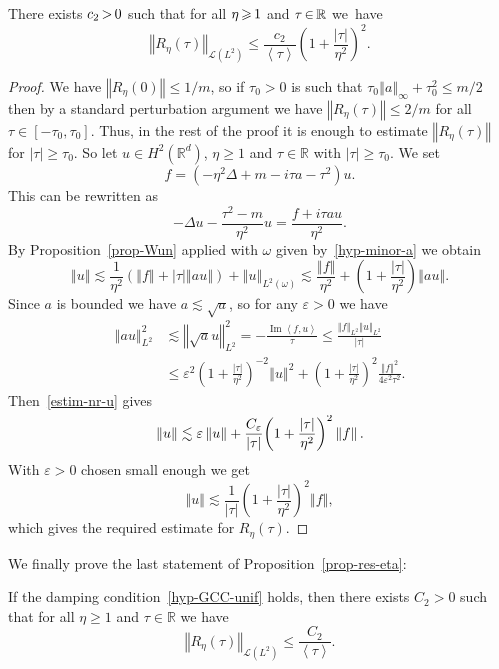 \documentclass[AHL,Unicode,longabstracts]{cedram}
\newcommand{\abs}[1]{\left\vert #1\right\vert}
\newcommand{\nr}[1]{\left\Vert #1\right\Vert}
\newcommand{\innp}[2]{\left< #1, #2 \right>}
\newcommand{\pppg}[1] {\left< #1 \right>}
\renewcommand{\leq}{\leqslant}
\renewcommand{\geq}{\geqslant}
\newcommand{\1}{\mathds 1}
\DeclareMathOperator{\Imop}{Im}
\renewcommand{\Im}{\Imop}
\newcommand{\R}{\mathbb{R}}
\newcommand{\D}{\Delta}
\newcommand{\e}{\varepsilon}
\renewcommand{\t}{\tau}
\renewcommand{\o}{\omega}
\newcommand{\Lc}{{\mathcal L}}
\newcommand*{\Mk}{\mkern -2mu}
\begin{document}
\begin{prop}\label{prop-estim-Reta}
There exists $c_2 \Mk>\Mk 0$ such that for all $\eta \Mk\geq\Mk 1$ and $\t \Mk\in\Mk \R$ we~have
\[
\nr{R_\eta(\t)}_{\Lc(L^2)} \leq \frac {c_2}{\pppg \tau} \left(1 + \frac {\abs \t}{\eta^2} \right)^2.
\]
\end{prop}

\begin{proof}
We have $\nr{R_\eta(0)} \leq 1/m$, so if $\t_0 > 0$ is such that $\t_0 \nr{a}_\infty + \t_0^2 \leq m/2$ then by a standard perturbation argument we have $\nr{R_\eta(\t)} \leq 2/m$ for all $\t \in [-\t_0,\t_0]$. Thus, in the rest of the proof it is enough to estimate $\nr{R_\eta(\t)}$ for $\abs \t \geq \t_0$. So let $u \in H^2(\R^d)$, $\eta \geq 1$ and $\t \in \R$ with $\abs \t \geq \t_0$. We set
\begin{equation*}
f = (-\eta^2 \D + m - i \t a - \t^2) u.
\end{equation*}
This can be rewritten as
\[
-\D u - \frac {\t^2-m} {\eta^2} u = \frac{f + i\t a u}{\eta^2}.
\]
By Proposition~\ref{prop-Wun} applied with $\o$ given by~\eqref{hyp-minor-a} we obtain
\begin{equation}\label{estim-nr-u}
\nr{u} \lesssim \frac 1 {\eta^2} \left(\nr{f} + \abs \t \nr{au} \right) + \nr{u}_{L^2(\o)} \lesssim \frac {\nr{f}}{\eta^2} + \left(1+\frac {\abs \t}{\eta^2} \right) \nr{a u}.
\end{equation}
Since $a$ is bounded we have $a \lesssim \sqrt a$, so for any $\e > 0$ we have
\begin{align*}
\nr{a u}_{L^2}^2 & \lesssim \nr{\sqrt a u}_{L^2}^2 = - \frac {\Im \innp{f}{u}}{\t} \leq \frac {\nr f_{L^2} \nr u_{L^2}} {\abs \t}\\
& \leq \e^2 \left(1 + \frac {\abs \t}{\eta^2} \right)^{-2} \nr{u}^2 + \left(1 + \frac {\abs \t}{\eta^2} \right)^2 \frac {\nr{f}^2}{4\e^2 \tau^2}.
\end{align*}
Then~\eqref{estim-nr-u} gives
\[
\nr{u} \lesssim \e \nr{u} + \frac {C_\e}{\abs \tau} \smash{\left(1 + \frac {\abs \t}{\eta^2} \right)^2} \nr{f}.
\]
With $\e > 0$ chosen small enough we get
\[
\nr{u} \lesssim \frac {1}{\abs \tau} {\left(1 + \frac {\abs \t}{\eta^2} \right)^2}\nr{f},
\]
which gives the required estimate for $R_\eta(\t)$.
\end{proof}


We finally prove the last statement of Proposition~\ref{prop-res-eta}:

\begin{prop}\label{prop-estim-Reta-GCC}
If the damping condition~\eqref{hyp-GCC-unif} holds, then there exists $C_2 > 0$ such that for all $\eta \geq 1$ and $\t \in \R$ we have
\[
\nr{R_\eta(\t)}_{\Lc(L^2)} \leq \frac {C_2} {\pppg \t}.
\]
\end{prop}
\end{document}
